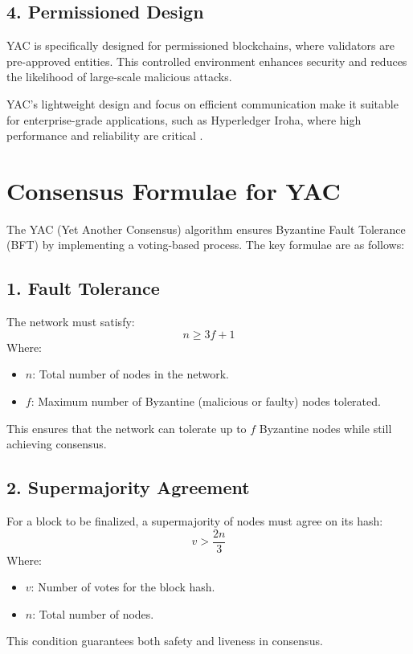 \documentclass{article}
\begin{document}
\subsection*{4. Permissioned Design}
YAC is specifically designed for permissioned blockchains, where validators are pre-approved entities. This controlled environment enhances security and reduces the likelihood of large-scale malicious attacks.

YAC’s lightweight design and focus on efficient communication make it suitable for enterprise-grade applications, such as Hyperledger Iroha, where high performance and reliability are critical \cite{yac2018bft}.

\section*{Consensus Formulae for YAC}

The YAC (Yet Another Consensus) algorithm ensures Byzantine Fault Tolerance (BFT) by implementing a voting-based process. The key formulae are as follows:

\subsection*{1. Fault Tolerance}
The network must satisfy:
\[
    n \geq 3f + 1
\]
Where:
\begin{itemize}
    \item \( n \): Total number of nodes in the network.
    \item \( f \): Maximum number of Byzantine (malicious or faulty) nodes tolerated.
\end{itemize}

This ensures that the network can tolerate up to \( f \) Byzantine nodes while still achieving consensus.

\subsection*{2. Supermajority Agreement}
For a block to be finalized, a supermajority of nodes must agree on its hash:
\[
    v > \frac{2n}{3}
\]
Where:
\begin{itemize}
    \item \( v \): Number of votes for the block hash.
    \item \( n \): Total number of nodes.
\end{itemize}

This condition guarantees both safety and liveness in consensus.
\end{document}
